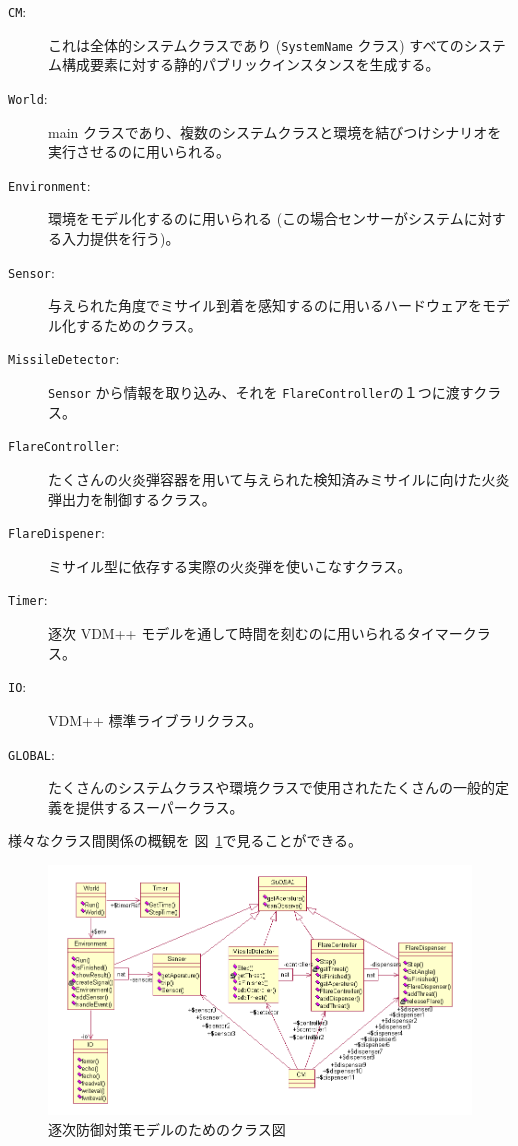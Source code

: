 \documentclass[\pformat,12pt]{jreport}
\begin{document}
\begin{description}
\item[\texttt{CM}:] これは全体的システムクラスであり (\texttt{SystemName} クラス) すべてのシステム構成要素に対する静的パブリックインスタンスを生成する。 
\item[\texttt{World}:]  main クラスであり、複数のシステムクラスと環境を結びつけシナリオを実行させるのに用いられる。
\item[\texttt{Environment}:] 環境をモデル化するのに用いられる (この場合センサーがシステムに対する入力提供を行う)。
\item[\texttt{Sensor}:] 与えられた角度でミサイル到着を感知するのに用いるハードウェアをモデル化するためのクラス。
\item[\texttt{MissileDetector}:]  \texttt{Sensor} から情報を取り込み、それを \texttt{FlareController}の１つに渡すクラス。
\item[\texttt{FlareController}:] たくさんの火炎弾容器を用いて与えられた検知済みミサイルに向けた火炎弾出力を制御するクラス。
\item[\texttt{FlareDispener}:] ミサイル型に依存する実際の火炎弾を使いこなすクラス。
\item[\texttt{Timer}:] 逐次 VDM++ モデルを通して時間を刻むのに用いられるタイマークラス。
\item[\texttt{IO}:]  VDM++ 標準ライブラリクラス。
\item[\texttt{GLOBAL}:] たくさんのシステムクラスや環境クラスで使用されたたくさんの一般的定義を提供するスーパークラス。
\end{description}

様々なクラス間関係の概観を 図~\ref{fig:classdiagseq}で見ることができる。

\begin{figure}
\begin{center}
\includegraphics[width=\textwidth]{seqCMclassdiag}
\end{center}
\caption{逐次防御対策モデルのためのクラス図\label{fig:classdiagseq}}
\end{figure}
\end{document}
